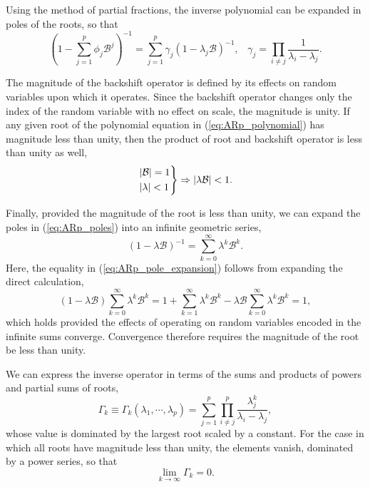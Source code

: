 \documentclass[12pt, twoside, draft]{article}
\begin{document}
Using the method of partial fractions, the inverse polynomial can be expanded in poles of the roots, so that
\begin{equation}\label{eq:ARp_poles}
\left( 1 - \sum_{j=1}^p \phi_j \mathcal{B}^j \right)^{-1} = \sum_{j=1}^p \gamma_j \left( 1 - \lambda_j \mathcal{B} \right)^{-1}, \hspace{10pt}
\gamma_j = \prod_{i\neq j}\frac{1}{\lambda_i - \lambda_j}.
\end{equation}

The magnitude of the backshift operator is defined by its effects on random variables upon which it operates.  Since the backshift operator changes only the index of the random variable with no effect on scale, the magnitude is unity.  If any given root of the polynomial equation in (\ref{eq:ARp_polynomial}) has magnitude less than unity, then the product of root and backshift operator is less than unity as well,
\begin{equation}
\begin{rcases}
|\mathcal{B}| = 1 \\
|\lambda| < 1
\end{rcases} \Rightarrow
|\lambda \mathcal{B} | < 1.
\end{equation}

Finally, provided the magnitude of the root is less than unity, we can expand the poles in (\ref{eq:ARp_poles}) into an infinite geometric series,
\begin{equation}\label{eq:ARp_pole_expansion}
(1 - \lambda \mathcal{B})^{-1} = \sum_{k=0}^\infty \lambda^k \mathcal{B}^k.
\end{equation}
Here, the equality in (\ref{eq:ARp_pole_expansion}) follows from expanding the direct calculation,
\begin{equation}
\left(1 - \lambda \mathcal{B} \right) \sum_{k=0}^\infty \lambda^k \mathcal{B}^k = 1 + \sum_{k=1}^{\infty} \lambda^k \mathcal{B}^k - \lambda \mathcal{B} \sum_{k=0}^\infty \lambda^k \mathcal{B}^k = 1,
\end{equation}
which holds provided the effects of operating on random variables encoded in the infinite sums converge.  Convergence therefore requires the magnitude of the root be less than unity.

We can express the inverse operator in terms of the sums and products of powers and partial sums of roots, 
\begin{equation}
\Gamma_k \equiv \Gamma_k(\lambda_1, \cdots, \lambda_p) = \sum_{j=1}^p \prod_{i\neq j}^p \frac{\lambda_j^k}{\lambda_i - \lambda_j},
\end{equation}
whose value is dominated by the largest root scaled by a constant.  For the case in which all roots have magnitude less than unity, the elements vanish, dominated by a power series, so that
\begin{equation}\label{eq:ARp_asymptotic_Gamma}
\lim_{k \to \infty} \Gamma_k = 0.
\end{equation}
\end{document}
